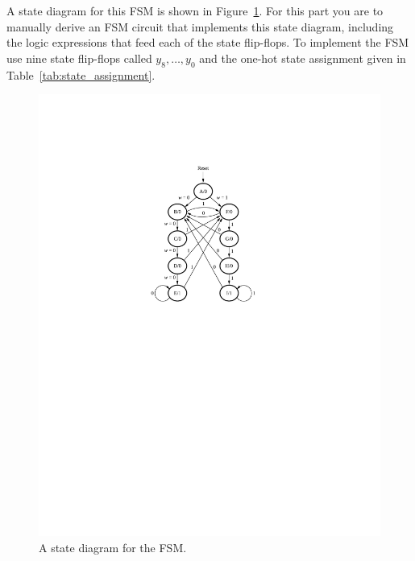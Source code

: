 \documentclass[epsfig,10pt,fullpage]{article}
\begin{document}
A state diagram for this FSM is shown in Figure~\ref{fig:state_diagram}. For this part you are to manually
derive an FSM circuit that implements this state diagram, including the logic expressions
that feed each of the state flip-flops. To
implement the FSM use nine state flip-flops called $y_8, \ldots, y_0$ and the 
one-hot state assignment given in Table~\ref{tab:state_assignment}.

\begin{figure}[H]
\centerline{
\includegraphics{figures/figure2.pdf}}
\caption{A state diagram for the FSM.}
\label{fig:state_diagram}
\end{figure}
\end{document}
